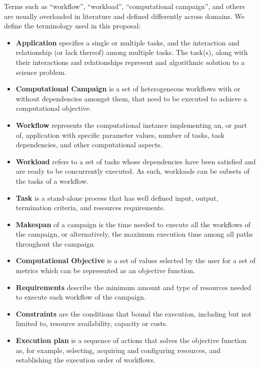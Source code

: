 \label{definitions}
Terms such as ``workflow'', ``workload'', ``computational campaign'', and others are usually overloaded in literature and defined differently across domains. We define the terminology used in this proposal:
\begin{itemize}
    \item \textbf{Application} specifies a single or multiple tasks, and the interaction and relationship (or lack thereof) among multiple tasks. The task(s), along with their interactions and relationships represent and algorithmic solution to a science problem.
    \item \textbf{Computational Campaign} is a set of heterogeneous workflows with or without dependencies amongst them, that need to be executed to achieve a computational objective.
    \item \textbf{Workflow} represents the computational instance implementing an, or part of, application with specific parameter values, number of tasks, task dependencies, and other computational aspects.
    \item \textbf{Workload} refers to a set of tasks whose dependencies have been satisfied and are ready to be concurrently executed. As such, workloads can be subsets of the tasks of a workflow.
    \item \textbf{Task} is a stand-alone process that has well defined input, output, termination criteria, and resources requirements.
    \item \textbf{Makespan} of a campaign is the time needed to execute all the workflows of the campaign, or alternatively, the maximum execution time among all paths throughout the campaign~\cite{chirkin2017execution}
    \item \textbf{Computational Objective} is a set of values selected by the user for a set of metrics which can be represented as an objective function.
    \item \textbf{Requirements} describe the minimum amount and type of resources needed to execute  each workflow of the campaign.
    \item \textbf{Constraints} are the conditions that bound the execution, including but not limited to, resource availability, capacity or costs.
    \item \textbf{Execution plan} is a sequence of actions that solves the objective function as, for example, selecting, acquiring and configuring resources, and establishing the execution order of workflows.
\end{itemize}
